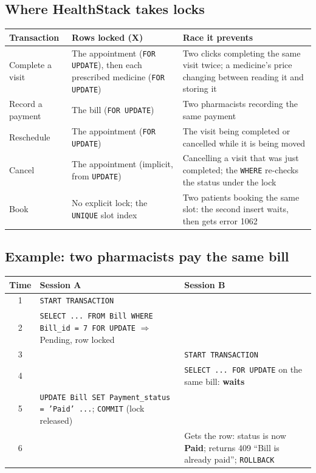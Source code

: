 \documentclass[11pt,a4paper]{article}
\newcommand{\code}[1]{\texttt{#1}}
\begin{document}
\subsection{Where HealthStack takes locks}

\begin{center}
\small
\begin{tabularx}{\textwidth}{P{3.2cm} P{4.2cm} L}
\toprule
\textbf{Transaction} & \textbf{Rows locked (X)} & \textbf{Race it prevents} \\
\midrule
Complete a visit & The appointment (\code{FOR UPDATE}), then each prescribed medicine (\code{FOR UPDATE}) & Two clicks completing the same visit twice; a medicine's price changing between reading it and storing it \\
Record a payment & The bill (\code{FOR UPDATE}) & Two pharmacists recording the same payment \\
Reschedule & The appointment (\code{FOR UPDATE}) & The visit being completed or cancelled while it is being moved \\
Cancel & The appointment (implicit, from \code{UPDATE}) & Cancelling a visit that was just completed; the \code{WHERE} re-checks the status under the lock \\
Book & No explicit lock; the \code{UNIQUE} slot index & Two patients booking the same slot: the second insert waits, then gets error 1062 \\
\bottomrule
\end{tabularx}
\end{center}

\subsection{Example: two pharmacists pay the same bill}

\begin{center}
\small
\begin{tabular}{c P{6.4cm} P{6.4cm}}
\toprule
\textbf{Time} & \textbf{Session A} & \textbf{Session B} \\
 & \code{START TRANSACTION} & \\
2 & \code{SELECT ... FROM Bill WHERE Bill\_id = 7 FOR UPDATE} $\Rightarrow$ Pending, row locked & \\
3 & & \code{START TRANSACTION} \\
4 & & \code{SELECT ... FOR UPDATE} on the same bill: \textbf{waits} \\
5 & \code{UPDATE Bill SET Payment\_status = 'Paid' ...}; \code{COMMIT} (lock released) & \\
6 & & Gets the row: status is now \textbf{Paid}; returns 409 ``Bill is already paid''; \code{ROLLBACK} \\
\bottomrule
\end{tabular}
\end{center}
\end{document}

